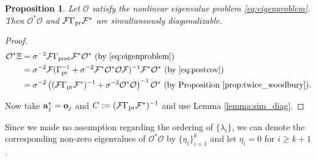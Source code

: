 \documentclass[ba]{imsart}
\newcommand{\obs}{\mathcal{O}}
\newcommand{\fwd}{\mathcal{F}}
\newcommand{\meas}{\mathbf{o}}
\theoremstyle{plain}
\newtheorem{proposition}[theorem]{Proposition}
\theoremstyle{definition}
\theoremstyle{remark}
\begin{document}
\begin{proposition}\label{prop:same_ev}
  Let $\obs$ satisfy the nonlinear eigenvalue problem
  \eqref{eq:eigenproblem}. Then $\obs^*\obs$ and $\fwd \prcov \fwd^*$
  are simultaneously diagonalizable.
\end{proposition}
\begin{proof}
  \begin{align}\label{eq:mod_conditions}
    \begin{split}
      \obs^* \Xi &= \sigma^{-2}\fwd \postcov \fwd^* \obs^*  \text{ (by \eqref{eq:eigenproblem})}\\
&= \sigma^{-2} \fwd( \prcov^{-1} + \sigma^{-2}  \fwd^* \obs^* \obs \fwd )^{-1} \fwd^* \obs^*  \text{ (by \eqref{eq:postcov})} \\
&= \sigma^{-2} \left ( (\fwd\prcov\fwd^*)^{-1} + \sigma^{-2}  \obs^* \obs \right )^{-1} \obs^* \text{ (by Proposition \ref{prop:twice_woodbury})}.
    \end{split}
  \end{align}

  Now take $\func_j^{*} = \meas_j$ and $C := (\fwd \prcov
  \fwd^*)^{-1}$ and use Lemma \ref{lemma:sim_diag}.
\end{proof}

Since we made no assumption regarding the ordering of $\{\lambda_i\}$,
we can denote the corresponding non-zero eigenvalues of $\obs^*\obs$
by $\{\eta_i\}_{i=1}^{k}$ and let $\eta_i = 0$ for $i \geq k+1$.
\end{document}
